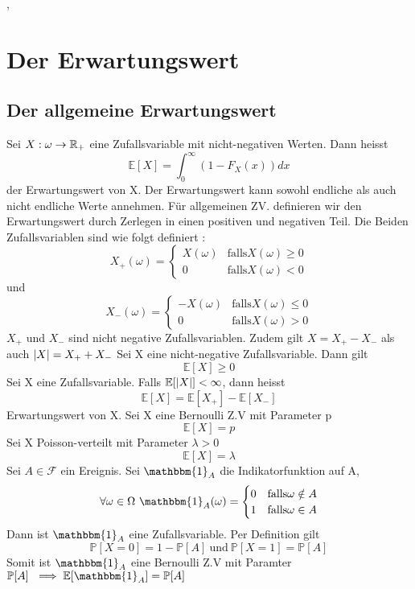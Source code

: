 \sep
\section{Der Erwartungswert}
\subsection{Der allgemeine Erwartungswert}
\Def[4.1] \newline
Sei \( X : \omega \rightarrow \mathbb{R}_+ \) eine Zufallsvariable mit nicht-negativen Werten. Dann heisst \[ \mathbb{E}[X] = \int_0^\infty (1-F_X(x)) dx\] der Erwartungswert von X. \newline
\Bem[4.2] \newline
Der Erwartungswert kann sowohl endliche als auch nicht endliche Werte annehmen. Für allgemeinen ZV. definieren wir den Erwartungswert durch Zerlegen in einen positiven und negativen Teil. Die Beiden Zufallsvariablen sind wie folgt definiert : \[X_+(\omega) = \begin{cases}
    X(\omega) & \text{falls} X(\omega) \geq 0 \\
    0 & \text{falls} X(\omega) < 0
\end{cases}\]
und \[X_-(\omega) = \begin{cases}
    -X(\omega) & \text{falls} X(\omega) \leq 0 \\
    0 & \text{falls} X(\omega) > 0
\end{cases}\]
\(X_+ \) und \(X_-\) sind nicht negative Zufallsvariablen. Zudem gilt \(X = X_+ - X_-\) als auch \( \left\lvert X \right\rvert = X_+ + X_-\)
\Satz[4.3] \newline
Sei X eine nicht-negative Zufallsvariable. Dann gilt \[ \mathbb{E}[X] \geq 0\]
\Def[4.4] Sei X eine Zufallsvariable. Falls \(\mathbb{E}[\left\lvert X \right\rvert] < \infty \), dann heisst \[ \mathbb{E}[X] = \mathbb{E}[X_+] - \mathbb{E}[X_-]\] Erwartungswert von X. \newline
\Bsp[4.5] \newline Sei X eine Bernoulli Z.V mit Parameter p \[\mathbb{E}[X] = p\] Sei X Poisson-verteilt mit Parameter \( \lambda > 0\) \[\mathbb{E}[X] = \lambda\] Sei \(A \in \mathcal{F}\) ein Ereignis. Sei \( \mathbbm{1}_A \) die Indikatorfunktion auf A, \[ \forall \omega \in \Omega \ \mathbbm{1}_A(\omega) = \begin{cases}
    0 & \text{falls} \omega \notin A \\
    1 & \text{falls} \omega \in A
\end{cases}\]
Dann ist \(\mathbbm{1}_A\) eine Zufallsvariable. Per Definition gilt \[\mathbb{P}[X = 0] = 1 - \mathbb{P}[A] \ \text{und} \ \mathbb{P}[X=1] = \mathbb{P}[A]\]
Somit ist \(\mathbbm{1}_A\) eine Bernoulli Z.V mit Paramter \( \mathbb{P}[A] \ \implies \mathbb{E}[\mathbbm{1}_A] = \mathbb{P}[A]\) \newline
